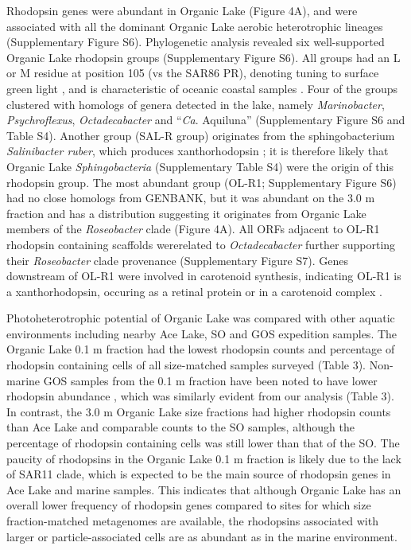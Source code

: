 Rhodopsin genes were abundant in Organic Lake (Figure 4A), and were associated with all the dominant Organic Lake aerobic heterotrophic lineages (Supplementary Figure S6). 
Phylogenetic analysis revealed six well-supported Organic Lake rhodopsin groups (Supplementary Figure S6). 
All groups had an L or M residue at position 105 (vs the SAR86 \ac{PR}), denoting tuning to surface green light \cite{Man2003, Gomez-Consarnau2007}, and is characteristic of oceanic coastal samples \cite{Rusch2007}. 
Four of the groups clustered with homologs of genera detected in the lake, namely \emph{Marinobacter}, \emph{Psychroflexus}, \emph{Octadecabacter} and ``\emph{Ca}. Aquiluna'' (Supplementary Figure S6 and Table S4). 
Another group (SAL-R group) originates from the sphingobacterium \emph{Salinibacter ruber}, which produces xanthorhodopsin \cite{Balashov2005}; it is therefore likely that Organic Lake \emph{Sphingobacteria} (Supplementary Table S4) were the origin of this rhodopsin group. 
The most abundant group (OL-R1; Supplementary Figure S6) had no close homologs from GENBANK, but it was abundant on the 3.0 \textmu{}m fraction and has a distribution suggesting it originates from Organic Lake members of the \emph{Roseobacter} clade (Figure 4A). 
All \acp{ORF} adjacent to OL-R1 rhodopsin containing scaffolds wererelated to \emph{Octadecabacter} further supporting their \emph{Roseobacter} clade provenance (Supplementary Figure S7). 
Genes downstream of OL-R1 were involved in carotenoid synthesis, indicating OL-R1 is a xanthorhodopsin, occuring as a retinal protein or in a carotenoid complex \cite{Balashov2005}. %

Photoheterotrophic potential of Organic Lake was compared with other aquatic environments including nearby Ace Lake, \ac{SO} and \ac{GOS} expedition samples. 
The Organic Lake 0.1 \textmu{}m fraction had the lowest rhodopsin counts and percentage of rhodopsin containing cells of all size-matched samples surveyed (Table 3). 
Non-marine \ac{GOS} samples from the 0.1 \textmu{}m fraction have been noted to have lower rhodopsin abundance \cite{Sharma2008}, which was similarly evident from our analysis (Table 3). 
In contrast, the 3.0 \textmu{}m Organic Lake size fractions had higher rhodopsin counts than Ace Lake and comparable counts to the \ac{SO} samples, although the percentage of rhodopsin containing cells was still lower than that of the \ac{SO}. 
The paucity of rhodopsins in the Organic Lake 0.1 \textmu{}m fraction is likely due to the lack of SAR11 clade, which is expected to be the main source of rhodopsin genes in Ace Lake and marine samples. 
This indicates that although Organic Lake has an overall lower frequency of rhodopsin genes compared to sites for which size fraction-matched metagenomes are available, the rhodopsins associated with larger or particle-associated cells are as abundant as in the marine environment.

